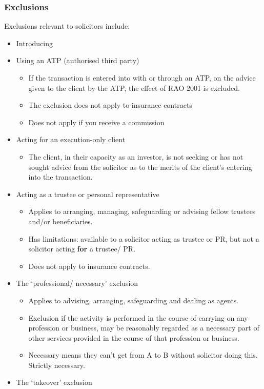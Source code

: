 \documentclass[
]{article}
\providecommand{\tightlist}{%
  \setlength{\itemsep}{0pt}\setlength{\parskip}{0pt}}
\begin{document}
\hypertarget{exclusions}{%
\subsubsection{Exclusions}\label{exclusions}}

Exclusions relevant to solicitors include:

\begin{itemize}
\tightlist
\item
  Introducing
\item
  Using an ATP (authorised third party)

  \begin{itemize}
  \tightlist
  \item
    If the transaction is entered into with or through an ATP, on the
    advice given to the client by the ATP, the effect of RAO 2001 is
    excluded.
  \item
    The exclusion does not apply to insurance contracts
  \item
    Does not apply if you receive a commission
  \end{itemize}
\item
  Acting for an execution-only client

  \begin{itemize}
  \tightlist
  \item
    The client, in their capacity as an investor, is not seeking or has
    not sought advice from the solicitor as to the merits of the
    client's entering into the transaction.
  \end{itemize}
\item
  Acting as a trustee or personal representative

  \begin{itemize}
  \tightlist
  \item
    Applies to arranging, managing, safeguarding or advising fellow
    trustees and/or beneficiaries.
  \item
    Has limitations: available to a solicitor acting as trustee or PR,
    but not a solicitor acting \textbf{for} a trustee/ PR.
  \item
    Does not apply to insurance contracts.
  \end{itemize}
\item
  The `professional/ necessary' exclusion

  \begin{itemize}
  \tightlist
  \item
    Applies to advising, arranging, safeguarding and dealing as agents.
  \item
    Exclusion if the activity is performed in the course of carrying on
    any profession or business, may be reasonably regarded as a
    necessary part of other services provided in the course of that
    profession or business.
  \item
    Necessary means they can't get from A to B without solicitor doing
    this. Strictly necessary.
  \end{itemize}
\item
  The `takeover' exclusion


\end{itemize}
\end{document}
